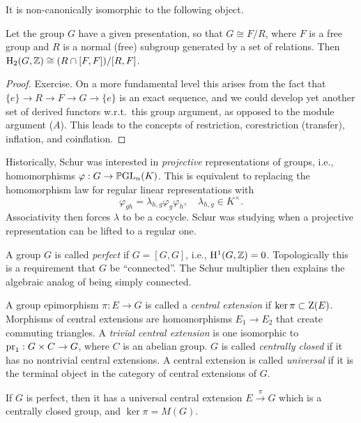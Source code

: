 It is non-canonically isomorphic to the following object.

\begin{thm}
    Let the group $G$ have a given presentation, so that $G\cong F\slash R$, where $F$ is a free group and $R$ is a normal (free) subgroup generated by a set of relations. Then $\mathrm{H}_2(G,\mathbb{Z})\cong (R\cap [F,F])\slash [R,F]$.
\end{thm}
\begin{proof}
    Exercise. On a more fundamental level this arises from the fact that $\{e\}\to R\to F\to G\to \{e\}$ is an exact sequence, and we could develop yet another set of derived functors w.r.t.\ this group argument, as opposed to the module argument ($A$). This leads to the concepts of restriction, corestriction (transfer), inflation, and coinflation.
\end{proof}

Historically, Schur was interested in \emph{projective} representations of groups, i.e., homomorphisms $\varphi:G\to \operatorname{\mathbb{P}GL}_n(K)$. This is equivalent to replacing the homomorphism law for regular linear representations with
\[\varphi_{gh}=\lambda_{h,g}\varphi_g\varphi_h,\quad\lambda_{h,g}\in K^\times.\]
Associativity then forces $\lambda$ to be a cocycle. Schur was studying when a projective representation can be lifted to a regular one. 

A group $G$ is called \emph{perfect} if $G=[G,G]$, i.e., $\mathrm{H}^1(G,\mathbb{Z})=0$. Topologically this is a requirement that $G$ be ``connected''. The Schur multiplier then explains the algebraic analog of being simply connected. 

\begin{defn}
    A group epimorphism $\pi:E\to G$ is called a \emph{central extension} if $\ker\pi\subset \mathrm{Z}(E)$.  Morphisms of central extensions are homomorphisms $E_1\to E_2$ that create commuting triangles. A \emph{trivial central extension} is one isomorphic to $\operatorname{pr}_1:G\times C\to G$, where $C$ is an abelian group. $G$ is called \emph{centrally closed} if it has no nontrivial central extensions. A central extension is called \emph{universal} if it is the terminal object in the category of central extensions of $G$.
\end{defn}

\begin{thm}[Schur]
    If $G$ is perfect, then it has a universal central extension $E\overset{\pi}{\to} G$ which is a centrally closed group, and $\ker\pi =M(G)$.
\end{thm}

